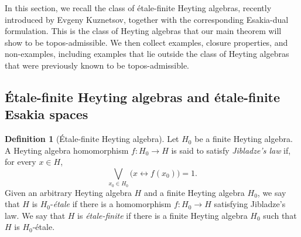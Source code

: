 \documentclass[12pt]{amsart}
\theoremstyle{plain}
\theoremstyle{definition}
\newtheorem{definition}[theorem]{Definition}
\begin{document}
In this section, we recall the class of étale-finite Heyting algebras, recently introduced by Evgeny Kuznetsov, together with the corresponding Esakia-dual formulation. This is the class of Heyting algebras that our main theorem will show to be topos-admissible. We then collect examples, closure properties, and non-examples, including examples that lie outside the class of Heyting algebras that were previously known to be topos-admissible.

\subsection{Étale-finite Heyting algebras and étale-finite Esakia spaces}

\begin{definition}[\'Etale-finite Heyting algebra]
    Let $H_{0}$ be a finite Heyting algebra. A Heyting algebra homomorphism $f\colon H_{0}\to H$ is said to satisfy \emph{Jibladze's law} if, for every $x\in H$,
    \begin{equation*}
        \bigvee_{x_0\in H_{0}}\bigl(x\leftrightarrow f(x_0)\bigr)=1.
    \end{equation*}
    Given an arbitrary Heyting algebra $H$ and a finite Heyting algebra $H_{0}$, we say that $H$ is $H_{0}$-\emph{étale} if there is a homomorphism $f\colon H_{0}\to H$ satisfying Jibladze's law. We say that $H$ is \emph{étale-finite} if there is a finite Heyting algebra $H_{0}$ such that $H$ is $H_{0}$-étale.
\end{definition}
\end{document}
